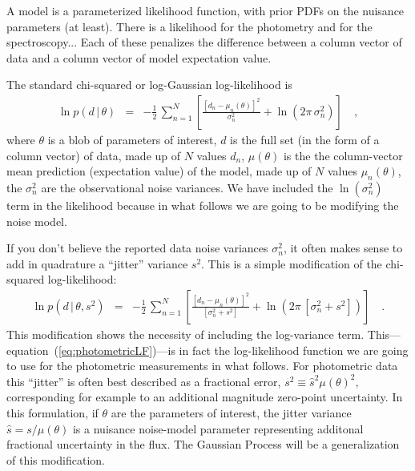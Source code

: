 \documentclass[iop,numberedappendix]{emulateapj}
\newcommand{\given}{\,|\,}
\begin{document}
A model is a parameterized likelihood function, with prior PDFs
on the nuisance parameters (at least).  There is a likelihood for
the photometry and for the spectroscopy...  Each of these penalizes
the difference between a column vector of data and a column vector of
model expectation value.

The standard chi-squared or log-Gaussian log-likelihood is
\begin{eqnarray}
\ln p(d\given\theta) &=& -\frac{1}{2}\,\sum_{n=1}^N \left[\frac{[d_n - \mu_n(\theta)]^2}{\sigma_n^2} + \ln(2\pi\,\sigma_n^2) \right]
\quad ,
\end{eqnarray}
where $\theta$ is a blob of parameters of interest,
$d$ is the full set (in the form of a column vector) of data,
made up of $N$ values $d_n$,
$\mu(\theta)$ is the the column-vector mean prediction (expectation value) of the model,
made up of $N$ values $\mu_n(\theta)$,
the $\sigma_n^2$ are the observational noise variances.
We have included the $\ln(\sigma_n^2)$ term in the likelihood because
in what follows we are going to be modifying the noise model.

If you don't believe the reported data noise variances $\sigma_n^2$,
it often makes sense to add in quadrature a ``jitter'' variance $s^2$.
This is a simple modification of the chi-squared log-likelihood:
\begin{eqnarray}\label{eq:photometricLF}
\ln p(d\given\theta,s^2) &=& -\frac{1}{2}\,\sum_{n=1}^N
                             \left[\frac{[d_n - \mu_n(\theta)]^2}
                             {[\sigma_n^2 + s^2]} + 
                             \ln(2\pi\,[\sigma_n^2 + s^2]) \right]
\quad .
\end{eqnarray}
This modification shows the necessity of including the log-variance
term.
This---equation~(\ref{eq:photometricLF})---is in fact the
log-likelihood function we are going to use for the photometric
measurements in what follows.  For photometric data this ``jitter'' is
often best described as a fractional error, $s^2 \equiv
\hat{s}^2\mu(\theta)^2$, corresponding for example to an additional
magnitude zero-point uncertainty.  In this formulation, if $\theta$
are the parameters of interest, the jitter variance $\hat{s} =
s/\mu(\theta)$ is a nuisance noise-model parameter representing
additonal fractional uncertainty in the flux.  The Gaussian Process
will be a generalization of this modification.
\end{document}
